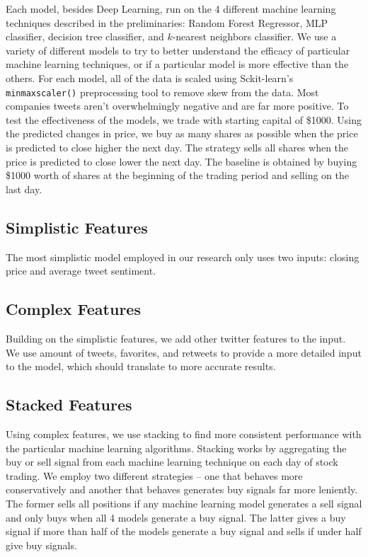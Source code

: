 \documentclass[../thesis.tex]{subfiles}
\begin{document}
Each model, besides Deep Learning, run on the 4 different machine learning techniques described in the preliminaries: Random Forest Regressor, MLP classifier, decision tree classifier, and $k$-nearest neighbors classifier. We use a variety of different models to try to better understand the efficacy of particular machine learning techniques, or if a particular model is more effective than the others. For each model, all of the data is scaled using Sckit-learn's \texttt{minmaxscaler()} preprocessing tool to remove skew from the data. Most companies tweets aren't overwhelmingly negative and are far more positive. To test the effectiveness of the models, we trade with starting capital of \$1000. Using the predicted changes in price, we buy as many shares as possible when the price is predicted to close higher the next day. The strategy sells all shares when the price is predicted to close lower the next day. The baseline is obtained by buying \$1000 worth of shares at the beginning of the trading period and selling on the last day. 

\subsection{Simplistic Features}

The most simplistic model employed in our research only uses two inputs: closing price and average tweet sentiment.

\subsection{Complex Features}

Building on the simplistic features, we add other twitter features to the input. We use amount of tweets, favorites, and retweets to provide a more detailed input to the model, which should translate to more accurate results. 

\subsection{Stacked Features}

Using complex features, we use stacking to find more consistent performance with the particular machine learning algorithms. Stacking works by aggregating the buy or sell signal from each machine learning technique on each day of stock trading. We employ two different strategies -- one that behaves more conservatively and another that behaves generates buy signals far more leniently. The former sells all positions if any machine learning model generates a sell signal and only buys when all 4 models generate a buy signal. The latter gives a buy signal if more than half of the models generate a buy signal and sells if under half give buy signals.
\end{document}
